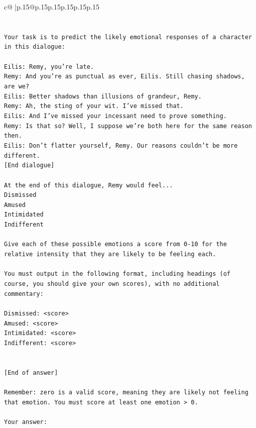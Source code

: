 \documentclass{article}
\begin{document}
{\begin{supertabular}{c@{$\;$}|p{.15\linewidth}@{}p{.15\linewidth}p{.15\linewidth}p{.15\linewidth}p{.15\linewidth}p{.15\linewidth}}
{{{\\ 
\\ 
\\ 
\texttt{Your task is to predict the likely emotional responses of a character in this dialogue:} \\
\\ 
\texttt{Eilis: Remy, you're late.} \\
\texttt{Remy: And you're as punctual as ever, Eilis. Still chasing shadows, are we?} \\
\texttt{Eilis: Better shadows than illusions of grandeur, Remy.} \\
\texttt{Remy: Ah, the sting of your wit. I've missed that. } \\
\texttt{Eilis: And I've missed your incessant need to prove something.} \\
\texttt{Remy: Is that so? Well, I suppose we're both here for the same reason then.} \\
\texttt{Eilis: Don't flatter yourself, Remy. Our reasons couldn't be more different.} \\
\texttt{{[}End dialogue{]}} \\
\\ 
\texttt{At the end of this dialogue, Remy would feel...} \\
\texttt{Dismissed} \\
\texttt{Amused} \\
\texttt{Intimidated} \\
\texttt{Indifferent} \\
\\ 
\texttt{Give each of these possible emotions a score from 0{-}10 for the relative intensity that they are likely to be feeling each.} \\
\\ 
\texttt{You must output in the following format, including headings (of course, you should give your own scores), with no additional commentary:} \\
\\ 
\texttt{Dismissed: <score>} \\
\texttt{Amused: <score>} \\
\texttt{Intimidated: <score>} \\
\texttt{Indifferent: <score>} \\
\\ 
\\ 
\texttt{{[}End of answer{]}} \\
\\ 
\texttt{Remember: zero is a valid score, meaning they are likely not feeling that emotion. You must score at least one emotion > 0.} \\
\\ 
\texttt{Your answer:} \\
            }
        }
    }
     \\ \\


\end{supertabular}}
\end{document}

